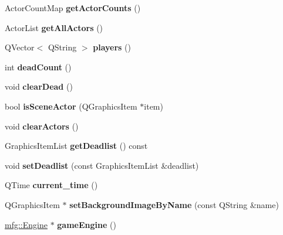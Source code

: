 \begin{DoxyCompactItemize}
Actor\+Count\+Map {\bfseries get\+Actor\+Counts} ()
\item 
\mbox{\label{class_game_scene_a13d54b44f642489278e20b486678c686}} 
Actor\+List {\bfseries get\+All\+Actors} ()
\item 
\mbox{\label{class_game_scene_a8a811a7b2497a20b8e0757e2bdc26932}} 
Q\+Vector$<$ Q\+String $>$ {\bfseries players} ()
\item 
\mbox{\label{class_game_scene_a7077ce88eca56dee27ba8deae2c5c1bf}} 
int {\bfseries dead\+Count} ()
\item 
\mbox{\label{class_game_scene_a26ee4d4610a8fd5b9af762d8a3c2f8d7}} 
void {\bfseries clear\+Dead} ()
\item 
\mbox{\label{class_game_scene_aeb498f64c57482b7a340587c03f886d9}} 
bool {\bfseries is\+Scene\+Actor} (Q\+Graphics\+Item $\ast$item)
\item 
\mbox{\label{class_game_scene_aa55dfeaf2d458b5c05d4dc206f8022ed}} 
void {\bfseries clear\+Actors} ()
\item 
\mbox{\label{class_game_scene_a6971c7adf7fed708c747322324ee2045}} 
Graphics\+Item\+List {\bfseries get\+Deadlist} () const
\item 
\mbox{\label{class_game_scene_a18424ff3ed1d4c423a7ca20f2191983c}} 
void {\bfseries set\+Deadlist} (const Graphics\+Item\+List \&deadlist)
\item 
\mbox{\label{class_game_scene_a484d473ed3a7537aec18066a382480d2}} 
Q\+Time {\bfseries current\+\_\+time} ()
\item 
\mbox{\label{class_game_scene_ac5875684ca060591cad3f2e02c3c7a21}} 
Q\+Graphics\+Item $\ast$ {\bfseries set\+Background\+Image\+By\+Name} (const Q\+String \&name)
\item 
\mbox{\label{class_game_scene_a0d67003cada8079ada8c2bf7ea924134}} 
\hyperlink{classmfg_1_1_engine}{mfg\+::\+Engine} $\ast$ {\bfseries game\+Engine} ()

\end{DoxyCompactItemize}
